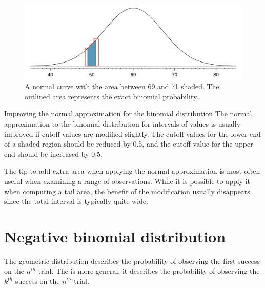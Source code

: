 \begin{figure}[h]
\centering
\includegraphics[width=\textwidth]{ch_distributions/figures/normApproxToBinomFail/normApproxToBinomFail}
\caption{A normal curve with the area between 69 and 71 shaded. The outlined area represents the exact binomial probability.}
\label{normApproxToBinomFail}
\end{figure}

\begin{onebox}{Improving the normal approximation for the binomial distribution}
  The normal approximation to the binomial distribution
  for intervals of values is usually improved if cutoff
  values are modified slightly.
  The cutoff values for the lower end of a shaded region
  should be reduced by 0.5, and the cutoff value for the
  upper end should be increased by 0.5.
\end{onebox}

The tip to add extra area when applying the normal approximation is most often useful when examining a range of observations. While it is possible to apply it when computing a tail area, the benefit of the modification usually disappears since the total interval is typically quite wide.




\section{Negative binomial distribution}
\label{negativeBinomial}


The geometric distribution describes the probability of observing the first success on the $n^{th}$ trial. The  is more general: it describes the probability of observing the $k^{th}$ success on the $n^{th}$ trial.

